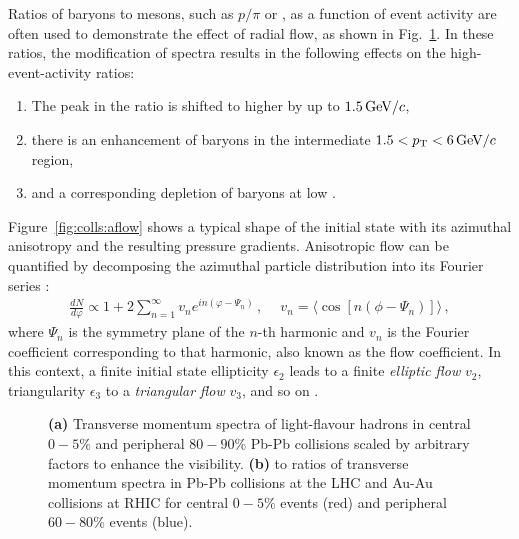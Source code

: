 Ratios of baryons to mesons, such as $p/\pi$ or \ltok, as a function of event activity are often used to demonstrate the effect of radial flow, as shown in Fig.~\ref{fig:colls:rflow}. In these ratios, the modification of \pt spectra results in the following effects on the high-event-activity ratios:
\begin{enumerate}
\item The peak in the ratio is shifted to higher \pt by up to $1.5 \text{\,GeV/$c$}$,
\item there is an enhancement of baryons in the intermediate \pt $1.5 < p_{\text{T}} < 6 \text{\,GeV/$c$}$ region,
\item and a corresponding depletion of baryons at low \pt.
\end{enumerate}

Figure~\ref{fig:colls:aflow} shows a typical shape of the initial state with its azimuthal anisotropy and the resulting pressure gradients. Anisotropic flow can be quantified by decomposing the azimuthal particle distribution into its Fourier series \cite{voloshinFlowStudyRelativistic1996}:
\begin{align}
\frac{dN}{d\varphi} \propto 1 + 2 \sum_{n=1}^{\infty} v_n e^{in(\varphi - \Psi_n)} \, , \quad \ v_n = \langle\cos[n(\phi - \Psi_n)]\rangle \, ,
\end{align}
where $\Psi_n$ is the symmetry plane of the $n$-th harmonic and $v_n$ is the Fourier coefficient corresponding to that harmonic, also known as the flow coefficient. In this context, a finite initial state ellipticity $\epsilon_2$ leads to a finite \textit{elliptic flow} $v_2$, triangularity $\epsilon_3$ to a \textit{triangular flow} $v_3$, and so on \cite{alverCollisionGeometryFluctuations2010, alicecollaborationHigherHarmonicAnisotropic2011}. 

\begin{figure}[H]
\caption{\textbf{(a)} Transverse momentum spectra of light-flavour hadrons in central $0-5\%$ and peripheral $80-90\%$ Pb-Pb collisions scaled by arbitrary factors to enhance the visibility. \cite{alicecollaborationALICEExperimentJourney2022, alicecollaborationCentralityDependenceRm2013, alicecollaborationRmSRm2013, alicecollaboration8920Phi2015} \textbf{(b)} \LA to \KOs ratios of transverse momentum spectra in Pb-Pb collisions at the LHC and Au-Au collisions at RHIC for central $0-5\%$ events (red) and peripheral $60-80\%$ events (blue). \cite{alicecollaborationRmSRm2013}}
\label{fig:colls:rflow}
\end{figure}

